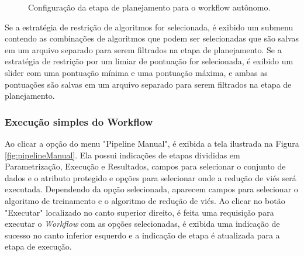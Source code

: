 \documentclass[portugues]{ic-tese}
\begin{document}
\begin{figure}[H]
    \centering
    \caption{Configuração da etapa de planejamento para o workflow autônomo.}
    \label{fig:configPlanejamento}
\end{figure}

Se a estratégia de restrição de algoritmos for selecionada, é exibido um submenu contendo as combinações de algoritmos que podem ser selecionadas que são salvas em um arquivo separado para serem filtrados na etapa de planejamento. Se a estratégia de restrição por um limiar de pontuação for selecionada, é exibido um slider com uma pontuação mínima e uma pontuação máxima, e ambas as pontuações são salvas em um arquivo separado para serem filtrados na etapa de planejamento.

\subsubsection{Execução simples do Workflow}

Ao clicar a opção do menu "Pipeline Manual", é exibida a tela ilustrada na Figura \ref{fig:pipelineManual}. Ela possui indicações de etapas divididas em Parametrização, Execução e Resultados, campos para selecionar o conjunto de dados e o atributo protegido e opções para selecionar onde a redução de viés será executada. Dependendo da opção selecionada, aparecem campos para selecionar o algoritmo de treinamento e o algoritmo de redução de viés. Ao clicar no botão "Executar" localizado no canto superior direito, é feita uma requisição para executar o \textit{Workflow} com as opções selecionadas, é exibida uma indicação de sucesso no canto inferior esquerdo e a indicação de etapa é atualizada para a etapa de execução.
\end{document}
